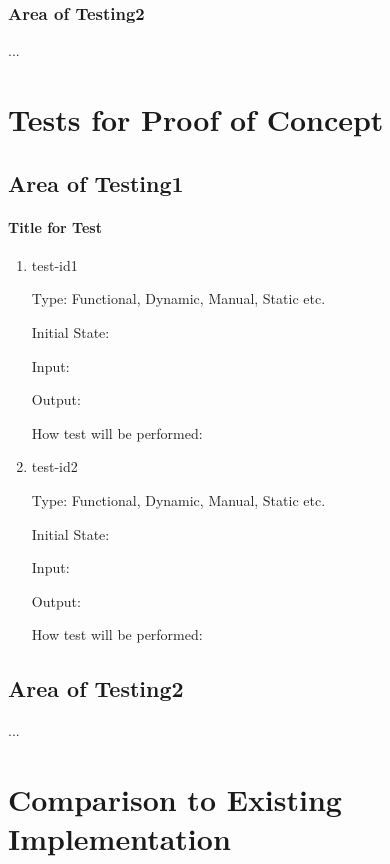 \documentclass[12pt, titlepage]{article}
\begin{document}
\subsubsection{Area of Testing2}

...

\section{Tests for Proof of Concept}

\subsection{Area of Testing1}
		
\paragraph{Title for Test}

\begin{enumerate}

\item{test-id1\\}

Type: Functional, Dynamic, Manual, Static etc.
					
Initial State: 
					
Input: 
					
Output: 
					
How test will be performed: 
					
\item{test-id2\\}

Type: Functional, Dynamic, Manual, Static etc.
					
Initial State: 
					
Input: 
					
Output: 
					
How test will be performed: 

\end{enumerate}

\subsection{Area of Testing2}

...

	
\section{Comparison to Existing Implementation}	
\end{document}
